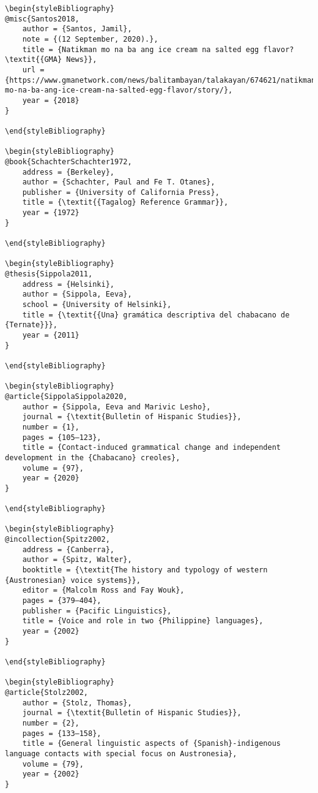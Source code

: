 \begin{stylelsUnNumberedSection}
\begin{verbatim}
\begin{styleBibliography}
@misc{Santos2018,
	author = {Santos, Jamil},
	note = {(12 September, 2020).},
	title = {Natikman mo na ba ang ice cream na salted egg flavor? \textit{{GMA} News}},
	url = {https://www.gmanetwork.com/news/balitambayan/talakayan/674621/natikman-mo-na-ba-ang-ice-cream-na-salted-egg-flavor/story/},
	year = {2018}
}

\end{styleBibliography}

\begin{styleBibliography}
@book{SchachterSchachter1972,
	address = {Berkeley},
	author = {Schachter, Paul and Fe T. Otanes},
	publisher = {University of California Press},
	title = {\textit{{Tagalog} Reference Grammar}},
	year = {1972}
}

\end{styleBibliography}

\begin{styleBibliography}
@thesis{Sippola2011,
	address = {Helsinki},
	author = {Sippola, Eeva},
	school = {University of Helsinki},
	title = {\textit{{Una} gramática descriptiva del chabacano de {Ternate}}},
	year = {2011}
}

\end{styleBibliography}

\begin{styleBibliography}
@article{SippolaSippola2020,
	author = {Sippola, Eeva and Marivic Lesho},
	journal = {\textit{Bulletin of Hispanic Studies}},
	number = {1},
	pages = {105–123},
	title = {Contact-induced grammatical change and independent development in the {Chabacano} creoles},
	volume = {97},
	year = {2020}
}

\end{styleBibliography}

\begin{styleBibliography}
@incollection{Spitz2002,
	address = {Canberra},
	author = {Spitz, Walter},
	booktitle = {\textit{The history and typology of western {Austronesian} voice systems}},
	editor = {Malcolm Ross and Fay Wouk},
	pages = {379–404},
	publisher = {Pacific Linguistics},
	title = {Voice and role in two {Philippine} languages},
	year = {2002}
}

\end{styleBibliography}

\begin{styleBibliography}
@article{Stolz2002,
	author = {Stolz, Thomas},
	journal = {\textit{Bulletin of Hispanic Studies}},
	number = {2},
	pages = {133–158},
	title = {General linguistic aspects of {Spanish}-indigenous language contacts with special focus on Austronesia},
	volume = {79},
	year = {2002}
}


\end{verbatim}
\end{stylelsUnNumberedSection}
